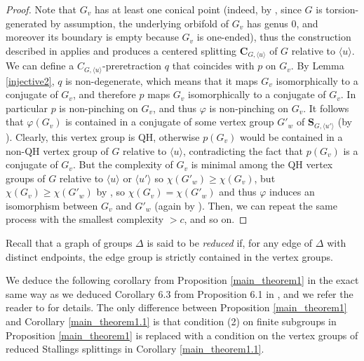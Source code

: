 \documentclass[a4paper, 11pt]{amsart}
\theoremstyle{definition}
\theoremstyle{remark}
\renewcommand{\geq}{\geqslant}
\begin{document}
\begin{proof}
\smallskip \noindent
Note that $G_v$ has at least one conical point (indeed, by \cite[Lemma 5.9]{AP24}, since $G$ is torsion-generated by assumption, the underlying orbifold of $G_v$ has genus $0$, and moreover its boundary is empty because $G_v$ is one-ended), thus the construction described in \cite[Subsection 4.4.2]{AP24} applies and produces a centered splitting $\mathbf{C}_{G,\langle u\rangle}$ of $G$ relative to $\langle u\rangle$. We can define a $C_{G,\langle u\rangle}$-preretraction $q$ that coincides with $p$ on $G_v$. By Lemma \ref{injective2}, $q$ is non-degenerate, which means that it maps $G_v$ isomorphically to a conjugate of $G_v$, and therefore $p$ maps $G_v$ isomorphically to a conjugate of $G_v$. In particular $p$ is non-pinching on $G_v$, and thus $\varphi$ is non-pinching on $G_v$. It follows that $\varphi(G_v)$ is contained in a conjugate of some vertex group $G'_w$ of $\mathbf{S}_{G,\langle u'\rangle}$ (by \cite[Proposition 2.31]{And18}). Clearly, this vertex group is QH, otherwise $p(G_v)$ would be contained in a non-QH vertex group of $G$ relative to $\langle u\rangle$, contradicting the fact that $p(G_v)$ is a conjugate of $G_v$. But the complexity of $G_v$ is minimal among the QH vertex groups of $G$ relative to $\langle u\rangle$ or $\langle u'\rangle$ so $\chi(G'_w)\geq \chi(G_v)$, but $\chi(G_v)\geq \chi(G'_w)$ by \cite[Lemma 3.5]{AP24}, so $\chi(G_v)=\chi(G'_w)$ and thus $\varphi$ induces an isomorphism between $G_v$ and $G'_w$ (again by \cite[Lemma 3.5]{AP24}). Then, we can repeat the same process with the smallest complexity $>c$, and so on.\end{proof}

Recall that a graph of groups $\Delta$ is said to be \emph{reduced} if, for any edge of $\Delta$ with distinct endpoints, the edge group is strictly contained in the vertex groups.

We deduce the following corollary from Proposition \ref{main_theorem1} in the exact same way as we deduced Corollary 6.3 from Proposition 6.1 in \cite{AP24}, and we refer the reader to \cite{AP24} for details. The only difference between Proposition \ref{main_theorem1} and Corollary \ref{main_theorem1.1} is that condition (2) on finite subgroups in Proposition \ref{main_theorem1} is replaced with a condition on the vertex groups of reduced Stallings splittings in Corollary \ref{main_theorem1.1}. 
\end{document}
